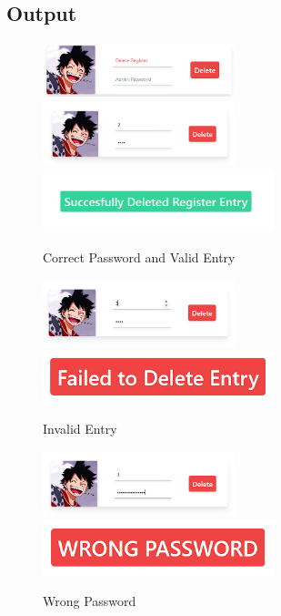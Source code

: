 \documentclass{article}
\begin{document}
\subsection{Output}
\begin{figure}[h!]
	\centering
  \caption{Correct Password and Valid Entry}
	\includegraphics[width=0.5\textwidth]{./Assets/p2701.png}
	\includegraphics[width=0.5\textwidth]{./Assets/p2702.png}
	\includegraphics[width=0.6\textwidth]{./Assets/p2703.png}
\end{figure}
\begin{figure}[h!]
	\centering
  \caption{Invalid Entry}
	\includegraphics[width=0.5\textwidth]{./Assets/p2704.png}
	\includegraphics[width=0.6\textwidth]{./Assets/p2705.png}
\end{figure}
\newpage
\begin{figure}[h!]
	\centering
  \caption{Wrong Password}
	\includegraphics[width=0.5\textwidth]{./Assets/p2706.png}
	\includegraphics[width=0.6\textwidth]{./Assets/p2707.png}
\end{figure}
\end{document}
